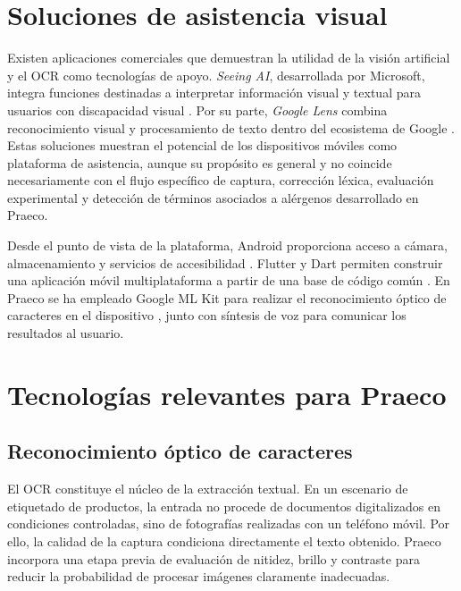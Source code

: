 \section{Soluciones de asistencia visual}

Existen aplicaciones comerciales que demuestran la utilidad de la visión artificial y el OCR como tecnologías de apoyo. \textit{Seeing AI}, desarrollada por Microsoft, integra funciones destinadas a interpretar información visual y textual para usuarios con discapacidad visual \cite{seeingai}. Por su parte, \textit{Google Lens} combina reconocimiento visual y procesamiento de texto dentro del ecosistema de Google \cite{googlelens}. Estas soluciones muestran el potencial de los dispositivos móviles como plataforma de asistencia, aunque su propósito es general y no coincide necesariamente con el flujo específico de captura, corrección léxica, evaluación experimental y detección de términos asociados a alérgenos desarrollado en Praeco.

Desde el punto de vista de la plataforma, Android proporciona acceso a cámara, almacenamiento y servicios de accesibilidad \cite{android}. Flutter y Dart permiten construir una aplicación móvil multiplataforma a partir de una base de código común \cite{flutter,dart}. En Praeco se ha empleado Google ML Kit para realizar el reconocimiento óptico de caracteres en el dispositivo \cite{mlkit}, junto con síntesis de voz para comunicar los resultados al usuario.

\section{Tecnologías relevantes para Praeco}

\subsection{Reconocimiento óptico de caracteres}

El OCR constituye el núcleo de la extracción textual. En un escenario de etiquetado de productos, la entrada no procede de documentos digitalizados en condiciones controladas, sino de fotografías realizadas con un teléfono móvil. Por ello, la calidad de la captura condiciona directamente el texto obtenido. Praeco incorpora una etapa previa de evaluación de nitidez, brillo y contraste para reducir la probabilidad de procesar imágenes claramente inadecuadas.


